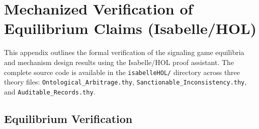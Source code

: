 \section{Mechanized Verification of Equilibrium Claims (Isabelle/HOL)}
\label{app:isabelle}

This appendix outlines the formal verification of the signaling game equilibria and mechanism design results using the Isabelle/HOL proof assistant. The complete source code is available in the \texttt{isabelleHOL/} directory across three theory files: \texttt{Ontological\_Arbitrage.thy}, \texttt{Sanctionable\_Inconsistency.thy}, and \texttt{Auditable\_Records.thy}.

\subsection*{Equilibrium Verification}

